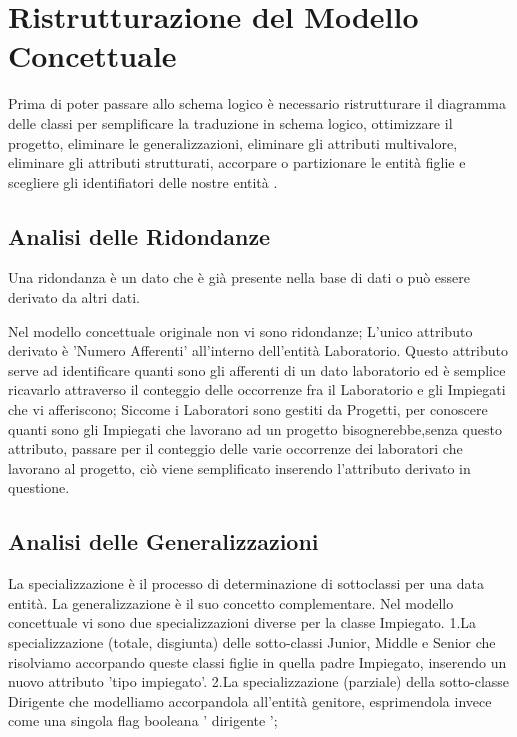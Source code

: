 \section{Ristrutturazione del Modello Concettuale}

Prima di poter passare allo schema logico è necessario ristrutturare il diagramma delle classi per semplificare la traduzione in schema logico, ottimizzare il progetto, eliminare le generalizzazioni, eliminare gli attributi multivalore, eliminare gli attributi strutturati, accorpare o partizionare le entità figlie e scegliere gli identifiatori delle nostre entità .\\


\subsection{Analisi delle Ridondanze}

Una ridondanza è un dato che è già presente nella base di dati o può essere derivato da altri dati. 

Nel modello concettuale originale non vi sono ridondanze; L'unico attributo derivato è 'Numero Afferenti' all'interno dell'entità Laboratorio. 
Questo attributo serve ad identificare quanti sono gli afferenti di un dato laboratorio ed è semplice ricavarlo attraverso il conteggio delle occorrenze fra il Laboratorio e gli Impiegati che vi afferiscono; Siccome i Laboratori sono gestiti da Progetti, per conoscere quanti sono gli Impiegati che lavorano ad un progetto bisognerebbe,senza questo attributo, passare per il conteggio delle varie occorrenze dei laboratori che lavorano al progetto, ciò viene semplificato inserendo l'attributo derivato in questione. 


\subsection{Analisi delle Generalizzazioni}
La specializzazione è il processo di determinazione di sottoclassi per una data entità. La generalizzazione è il suo concetto complementare.
Nel modello concettuale vi sono due specializzazioni diverse per la classe Impiegato.\newline
1.La specializzazione (totale, disgiunta) delle sotto-classi Junior, Middle e Senior che risolviamo accorpando queste classi figlie in quella padre Impiegato, inserendo un nuovo attributo 'tipo impiegato'.\newline
2.La specializzazione (parziale) della sotto-classe Dirigente che modelliamo accorpandola all'entità genitore, esprimendola invece come una singola flag booleana ' dirigente ';

